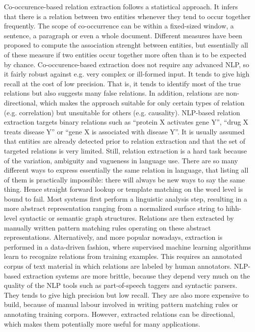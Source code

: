 Co-occurence-based relation extraction follows a statistical approach. It infers that there is a relation between two entities whenever they tend to occur together frequently. 
The scope of co-occurrence can be within a fixed-sized window, a sentence, a paragraph or even a whole document. 
Different measures have been proposed to compute the association strenght between entities, but essentially all of these measure if two entities occur together more often than is to be expected by chance. 
Co-occurence-based extraction does not require any advanced NLP, so it fairly robust against e.g. very complex or ill-formed input. It tends to give high recall at the cost of low precision. 
That is, it tends to identify most of the true relations but also suggests many false relations. 
In addition, relations are non-directional, which makes the approach suitable for only certain types of relation (e.g. correlation) but unsuitable for others (e.g. causality).
NLP-based relation extraction targets binary relations such as ``protein X activates gene Y'', ``drug X treats disease Y'' or ``gene X is associated with disease Y''.
It is usually assumed that entities are already detected prior to relation extraction and that the set of targeted relations is very limited.
Still, relation extraction is a hard task because of the variation, ambiguity and vagueness in language use.
There are so many different ways to express essentially the same relation in language, that listing all of them is practically impossible: there will always be new ways to say the same thing.
Hence straight forward lookup or template matching on the word level is bound to fail.
Most systems first perform a linguistic analysis step, resulting in a more abstract representation ranging from a normalized surface string to hihh-level syntactic or semantic graph structures. 
Relations are then extracted by manually written pattern matching rules operating on these abstract representations.
Alternatively, and more popular nowadays, extraction is performed in a data-driven fashion, where supervised machine learning algorithms learn to recognize relations from training examples.
This requires an annotated corpus of text material in which relations are labeled by human annotators.
NLP-based extraction systems are more brittle, because they depend very much on the quality of the NLP tools such as part-of-speech taggers and syntactic parsers.
They tends to give high precision but low recall.
They are also more expensive to build, because of manual labour involved in writing pattern matching rules or annotating training corpora.
However, extracted relations can be directional, which makes them potentially more useful for many applications. 

